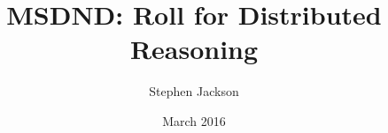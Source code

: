 \documentclass[12pt,oneside]{article}
\begin{document}
\doublespacing

\title{MSDND: Roll for Distributed Reasoning}
\author{Stephen Jackson}
\date{March 2016}
\maketitle






\end{document}
